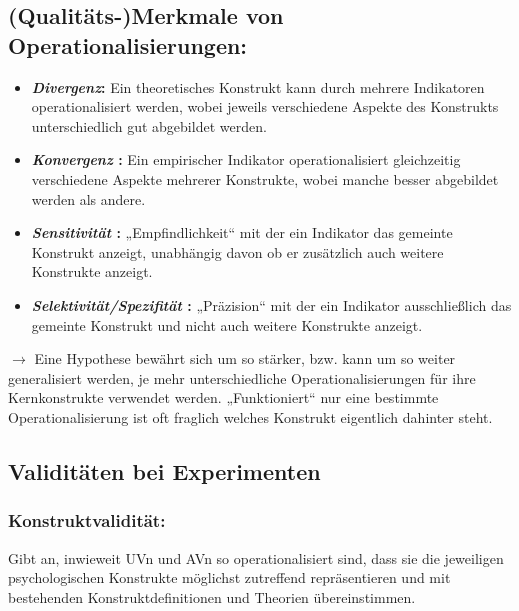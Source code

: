 \documentclass[
]{book}
\providecommand{\tightlist}{%
  \setlength{\itemsep}{0pt}\setlength{\parskip}{0pt}}
\begin{document}
\hypertarget{qualituxe4ts-merkmale-von-operationalisierungen-2}{%
\subsection{(Qualitäts-)Merkmale von Operationalisierungen:}\label{qualituxe4ts-merkmale-von-operationalisierungen-2}}

\begin{itemize}
\tightlist
\item
  \textbf{\emph{Divergenz}:} Ein theoretisches Konstrukt kann durch mehrere Indikatoren operationalisiert werden, wobei jeweils verschiedene Aspekte des Konstrukts unterschiedlich gut abgebildet werden.
\item
  \textbf{\emph{Konvergenz} :} Ein empirischer Indikator operationalisiert gleichzeitig verschiedene Aspekte mehrerer Konstrukte, wobei manche besser abgebildet werden als andere.
\item
  \textbf{\emph{Sensitivität} : } „Empfindlichkeit`` mit der ein Indikator das gemeinte Konstrukt anzeigt,
  unabhängig davon ob er zusätzlich auch weitere Konstrukte anzeigt.
\item
  \textbf{\emph{Selektivität/Spezifität} : } „Präzision`` mit der ein Indikator ausschließlich das gemeinte Konstrukt
  und nicht auch weitere Konstrukte anzeigt. \smallskip \newline
\end{itemize}

\(\rightarrow\) Eine Hypothese bewährt sich um so stärker, bzw. kann um so weiter generalisiert werden, je
mehr unterschiedliche Operationalisierungen für ihre Kernkonstrukte verwendet werden.
„Funktioniert`` nur eine bestimmte Operationalisierung ist oft fraglich welches Konstrukt eigentlich
dahinter steht.

\hypertarget{validituxe4ten-bei-experimenten-1}{%
\subsection{Validitäten bei Experimenten}\label{validituxe4ten-bei-experimenten-1}}

\hypertarget{konstruktvalidituxe4t-1}{%
\subsubsection{Konstruktvalidität:}\label{konstruktvalidituxe4t-1}}

Gibt an, inwieweit UVn und AVn so operationalisiert sind, dass sie die jeweiligen psychologischen
Konstrukte möglichst zutreffend repräsentieren und mit bestehenden Konstruktdefinitionen und
Theorien übereinstimmen.
\end{document}
